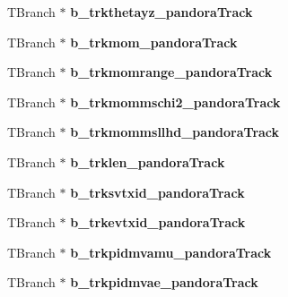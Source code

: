 \begin{DoxyCompactItemize}
\item 
\hypertarget{classanatree_a91e36647bf3e09234016a2e0a0c3f7e1}{T\-Branch $\ast$ {\bfseries b\-\_\-trkthetayz\-\_\-pandora\-Track}}\label{classanatree_a91e36647bf3e09234016a2e0a0c3f7e1}

\item 
\hypertarget{classanatree_a9ab3395c21f184f841c34055bf61c341}{T\-Branch $\ast$ {\bfseries b\-\_\-trkmom\-\_\-pandora\-Track}}\label{classanatree_a9ab3395c21f184f841c34055bf61c341}

\item 
\hypertarget{classanatree_a8c596f870bc8c1c2260ff93b757efa6c}{T\-Branch $\ast$ {\bfseries b\-\_\-trkmomrange\-\_\-pandora\-Track}}\label{classanatree_a8c596f870bc8c1c2260ff93b757efa6c}

\item 
\hypertarget{classanatree_adff23f0d3e964de61ba28b8b99062c09}{T\-Branch $\ast$ {\bfseries b\-\_\-trkmommschi2\-\_\-pandora\-Track}}\label{classanatree_adff23f0d3e964de61ba28b8b99062c09}

\item 
\hypertarget{classanatree_a973b219744deea321547c65c1ff09db8}{T\-Branch $\ast$ {\bfseries b\-\_\-trkmommsllhd\-\_\-pandora\-Track}}\label{classanatree_a973b219744deea321547c65c1ff09db8}

\item 
\hypertarget{classanatree_a93475fed52d95766aca06675d262da2f}{T\-Branch $\ast$ {\bfseries b\-\_\-trklen\-\_\-pandora\-Track}}\label{classanatree_a93475fed52d95766aca06675d262da2f}

\item 
\hypertarget{classanatree_af41fa3b3917603256c23c0992d2b6f92}{T\-Branch $\ast$ {\bfseries b\-\_\-trksvtxid\-\_\-pandora\-Track}}\label{classanatree_af41fa3b3917603256c23c0992d2b6f92}

\item 
\hypertarget{classanatree_a4ec2081d324c9899ab98369a8855c199}{T\-Branch $\ast$ {\bfseries b\-\_\-trkevtxid\-\_\-pandora\-Track}}\label{classanatree_a4ec2081d324c9899ab98369a8855c199}

\item 
\hypertarget{classanatree_a3b45b5181c44103280780aae822217f9}{T\-Branch $\ast$ {\bfseries b\-\_\-trkpidmvamu\-\_\-pandora\-Track}}\label{classanatree_a3b45b5181c44103280780aae822217f9}

\item 
\hypertarget{classanatree_a7b901d4df3119547ad3f6a8b9c09bb80}{T\-Branch $\ast$ {\bfseries b\-\_\-trkpidmvae\-\_\-pandora\-Track}}\label{classanatree_a7b901d4df3119547ad3f6a8b9c09bb80}


\end{DoxyCompactItemize}
